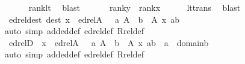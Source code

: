 \begin{isabellebody}
\ \ \ \ \isamarkupfalse%
\ rank{\isacharunderscore}{\kern0pt}lt\ \isamarkupfalse%
\ blast{\isacharplus}{\kern0pt}\isanewline
\ \ \isamarkupfalse%
\isanewline
\ \ \isamarkupfalse%
\ {\isachardoublequoteopen}rank{\isacharparenleft}{\kern0pt}y{\isacharparenright}{\kern0pt}\ {\isacharless}{\kern0pt}\ rank{\isacharparenleft}{\kern0pt}x{\isacharparenright}{\kern0pt}{\isachardoublequoteclose}\isanewline
\ \ \ \ \isamarkupfalse%
\ lt{\isacharunderscore}{\kern0pt}trans\ \isamarkupfalse%
\ blast\isanewline
{}\isamarkupfalse%
%
\endisatagproof
{\isafoldproof}%
%
\isadelimproof
\isanewline
%
\endisadelimproof
\isanewline
{}\isamarkupfalse%
\ edrel{\isacharunderscore}{\kern0pt}dest\ {\isacharbrackleft}{\kern0pt}dest{\isacharbrackright}{\kern0pt}{\isacharcolon}{\kern0pt}\ {\isachardoublequoteopen}x\ {\isasymin}\ edrel{\isacharparenleft}{\kern0pt}A{\isacharparenright}{\kern0pt}\ {\isasymLongrightarrow}\ {\isasymexists}\ a{\isasymin}\ A{\isachardot}{\kern0pt}\ {\isasymexists}\ b\ {\isasymin}\ A{\isachardot}{\kern0pt}\ x\ {\isacharequal}{\kern0pt}{\isasymlangle}a{\isacharcomma}{\kern0pt}b{\isasymrangle}{\isachardoublequoteclose}\isanewline
%
\isadelimproof
\ \ %
\endisadelimproof
%
\isatagproof
{}\isamarkupfalse%
{\isacharparenleft}{\kern0pt}auto\ simp\ add{\isacharcolon}{\kern0pt}ed{\isacharunderscore}{\kern0pt}def\ edrel{\isacharunderscore}{\kern0pt}def\ Rrel{\isacharunderscore}{\kern0pt}def{\isacharparenright}{\kern0pt}%
\endisatagproof
{\isafoldproof}%
%
\isadelimproof
\isanewline
%
\endisadelimproof
\isanewline
{}\isamarkupfalse%
\ edrelD\ {\isacharcolon}{\kern0pt}\ {\isachardoublequoteopen}x\ {\isasymin}\ edrel{\isacharparenleft}{\kern0pt}A{\isacharparenright}{\kern0pt}\ {\isasymLongrightarrow}\ {\isasymexists}\ a{\isasymin}\ A{\isachardot}{\kern0pt}\ {\isasymexists}\ b\ {\isasymin}\ A{\isachardot}{\kern0pt}\ x\ {\isacharequal}{\kern0pt}{\isasymlangle}a{\isacharcomma}{\kern0pt}b{\isasymrangle}\ {\isasymand}\ a\ {\isasymin}\ domain{\isacharparenleft}{\kern0pt}b{\isacharparenright}{\kern0pt}{\isachardoublequoteclose}\isanewline
%
\isadelimproof
\ \ %
\endisadelimproof
%
\isatagproof
{}\isamarkupfalse%
{\isacharparenleft}{\kern0pt}auto\ simp\ add{\isacharcolon}{\kern0pt}ed{\isacharunderscore}{\kern0pt}def\ edrel{\isacharunderscore}{\kern0pt}def\ Rrel{\isacharunderscore}{\kern0pt}def{\isacharparenright}{\kern0pt}%
\endisatagproof
{\isafoldproof}%
%
\isadelimproof
\isanewline
%
\endisadelimproof
\isanewline

\end{isabellebody}
